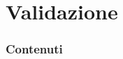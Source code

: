 \documentclass[Serif, 10pt, brown]{beamer}
\theoremstyle{example}
\theoremstyle{plain}
\begin{document}
    
    
    

        
    
    

\section[Valid]{Validazione}
    \begin{frame}
        \frametitle{Contenuti}
        \transblindsvertical
        \tableofcontents[currentsection]
    \end{frame}
    
    

    



%

    
%    

%    

%    
\end{document}
